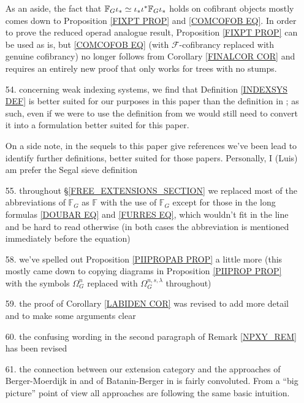 \documentclass{article}
\begin{document}
\begin{itemize}
	As an aside, the fact that 	
	$\mathbb{F}_G \iota_{\**} \simeq 
	\iota_{\**} \iota^{\**} \mathbb{F}_G \iota_{\**}$
	holds on cofibrant objects mostly comes down to
	Proposition \ref{FIXPT PROP} 
	and \eqref{COMCOFOB EQ}.
%	
	In order to prove the reduced operad analogue result, 
	Proposition \ref{FIXPT PROP} can be used as is, 
	but \eqref{COMCOFOB EQ} 
	(with $\mathcal{F}$-cofibrancy replaced with genuine cofibrancy)
	no longer follows from Corollary \ref{FINALCOR COR}
	and requires an entirely new proof that only works
	for trees with no stumps.
	
	\item[54.] concerning weak indexing systems,
	we find that Definition \ref{INDEXSYS DEF}
	is better suited for our purposes in this paper than 
	the definition in \cite{Pe17}; as such, even if we were to use the definition from \cite{Pe17} we would still need to convert it into a formulation better suited for this paper.
	
	On a side note, in the sequels to this paper 
	{\color{red} give references}
	we've been lead to identify further definitions,
	better suited for those papers.
	Personally, I (Luis) am prefer the Segal sieve definition
	
	
	\item[55.] throughout \S \ref{FREE_EXTENSIONS_SECTION}
	we replaced most of the abbreviations of
	$\mathbb{F}_G$ as $\mathbb{F}$ with the use of $\mathbb{F}_G$
	except for those in the long formulas
	\eqref{DOUBAR EQ} and \eqref{FURRES EQ},
	which wouldn't fit in the line and be hard to read otherwise
	(in both cases the abbreviation is mentioned immediately before the equation)

	\item[58.]
	we've spelled out Proposition \ref{PIIPROPAB PROP}
	a little more (this mostly came down to copying
	diagrams in Proposition \ref{PIIPROP PROP}
	with the symbols 
	$\Omega^n_G$
	replaced with 
	$\Omega^{n,s,\lambda}_{G}$ throughout)
	
	\item[59.] the proof of Corollary \ref{LABIDEN COR}
	was revised to add more detail and to make
	some arguments clear

	\item[60.]
	the confusing wording in the second paragraph of 
	Remark \ref{NPXY_REM} has been revised

	\item[61.] the connection between our extension category and the approaches 
	of Berger-Moerdijk in \cite{BM03}
	and of Batanin-Berger in \cite{BB17}
	is fairly convoluted.
	From a ``big picture'' point of view all approaches 
	are following the same basic intuition. 
	

\end{itemize}
\end{document}
